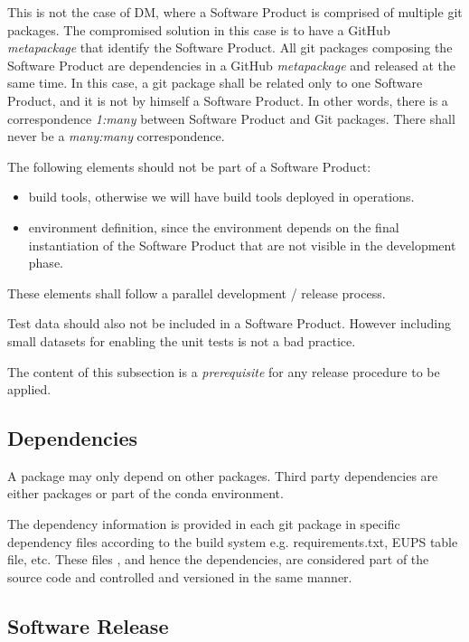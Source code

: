 This is not the case of DM, where a Software Product is comprised of multiple git packages.
The compromised solution in this case is to have a GitHub \textit{metapackage} that identify the Software Product.
All git packages composing the Software Product are dependencies in a GitHub \textit{metapackage} and released at the same time.
In this case, a git package shall be related only to one Software Product, and it is not by himself a Software Product.
In other words, there is a correspondence \textit{1:many} between Software Product and Git packages. 
There shall never be a \textit{many:many} correspondence.

The following elements should not be part of a Software Product:

\begin{itemize}
\item build tools, otherwise we will have build tools deployed in operations.
\item environment definition, since the environment depends on the final instantiation of the Software Product that are not visible in the development phase.
\end{itemize}

These elements shall follow a parallel development / release process.

Test data should also not be included in a Software Product. However including small datasets for enabling the unit tests is not a bad practice.

The content of this subsection is a \textit{prerequisite} for any release procedure to be applied.


\subsection{Dependencies} \label{sec:dependencies}

A package may only depend on other packages. Third party dependencies are either packages or part of the conda environment.

The dependency information is provided in each git package in specific dependency files  according to the build system e.g.  requirements.txt, EUPS table file, etc.
These files , and hence the dependencies,  are considered part of the source code and controlled  and versioned in the same manner.


\subsection{Software Release} \label{sec:swrel}

